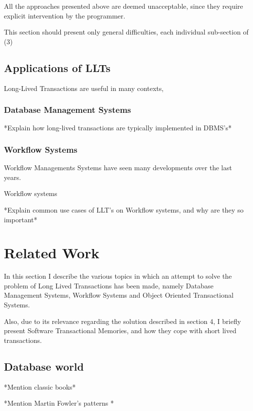 \documentclass{llncs}
\begin{document}
All the approaches presented above are deemed unacceptable, since they
require explicit intervention by the programmer. 

This section should present only general difficulties, each individual
sub-section of (3)

\subsection{Applications of LLTs}

Long-Lived Transactions are useful in many contexts, 

\subsubsection{Database Management Systems}

*Explain how long-lived transactions are typically implemented in DBMS's*

\subsubsection{Workflow Systems}

Workflow Managements Systems have seen many developments over the last
years.

Workflow systems 

*Explain common use cases of LLT's on Workflow systems, and why are
they so important*


\section{Related Work}

In this section I describe the various topics in which an attempt to
solve the problem of Long Lived Transactions has been made, namely
Database Management Systems, Workflow Systems and Object Oriented
Transactional Systems.

Also, due to its relevance regarding the
solution described in section 4, I briefly present Software
Transactional Memories, and how they cope with short lived transactions.

\subsection{Database world}

*Mention classic books*

*Mention Martin Fowler's patterns \cite{fowler2003patterns}*
\end{document}
